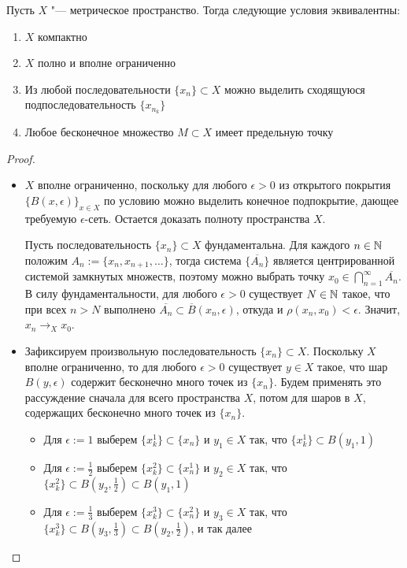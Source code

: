\begin{theorem}\label{thm3.2}
    Пусть $X$ "--- метрическое пространство. Тогда следующие условия эквивалентны:
    \begin{enumerate}
        \item $X$ компактно
        \item $X$ полно и вполне ограниченно
        \item Из любой последовательности $\{x_n\} \subset X$ можно выделить сходящуюся подпоследовательность $\{x_{n_k}\}$
        \item Любое бесконечное множество $M \subset X$ имеет предельную точку
    \end{enumerate}
\end{theorem}

\begin{proof}~
    \begin{itemize}
        \item{}$X$ вполне ограниченно, поскольку для любого $\epsilon > 0$ из открытого покрытия $\{B(x, \epsilon)\}_{x \in X}$ по условию можно выделить конечное подпокрытие, дающее требуемую $\epsilon$-сеть. Остается доказать полноту пространства $X$.
        
        Пусть последовательность $\{x_n\} \subset X$ фундаментальна. Для каждого $n \in \mathbb{N}$ положим $A_n := \{x_n, x_{n+1}, \dotsc \}$, тогда система $\{\overline{A_n}\}$ является центрированной системой замкнутых множеств, поэтому можно выбрать точку $x_0 \in \bigcap_{n=1}^\infty \overline{A_n}$. В силу фундаментальности, для любого $\epsilon > 0$ существует $N \in \mathbb{N}$ такое, что при всех $n > N$ выполнено $\overline{A_n} \subset \overline B(x_n, \epsilon)$, откуда и $\rho(x_n, x_0) < \epsilon$. Значит, $x_n \to_X x_0$.
        
        \item{}Зафиксируем произвольную последовательность $\{x_n\} \subset X$. Поскольку $X$ вполне ограниченно, то для любого $\epsilon > 0$ существует $y \in X$ такое, что шар $B(y, \epsilon)$ содержит бесконечно много точек из $\{x_n\}$. Будем применять это рассуждение сначала для всего пространства $X$, потом для шаров в $X$, содержащих бесконечно много точек из $\{x_n\}$.
        \begin{itemize}
            \item Для $\epsilon := 1$ выберем $\{x^1_k\} \subset \{x_n\}$ и $y_1 \in X$ так, что $\{x^1_k\} \subset B(y_1, 1)$
            \item Для $\epsilon := \frac 12$ выберем $\{x^2_k\} \subset \{x^1_n\}$ и $y_2 \in X$ так, что $\{x^2_k\} \subset B(y_2, \frac 12) \subset B(y_1, 1)$
            \item Для $\epsilon := \frac 13$ выберем $\{x^3_k\} \subset \{x^2_n\}$ и $y_3 \in X$ так, что $\{x^3_k\} \subset B(y_3, \frac 13) \subset B(y_2, \frac 12)$, и так далее
        \end{itemize}


\end{itemize}
\end{proof}
